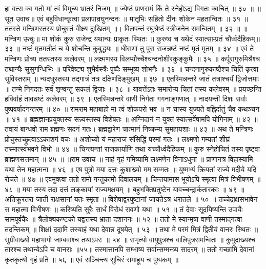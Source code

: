 हा वत्स क्व गतो मां त्वं विमुच्य भ्रातरं निजम् ॥
ज्येष्ठं प्राणसमं किं ते स्नेहोऽद्य विगतः क्वचित् ॥ ३० ॥
॥सूत उवाच॥
एवं बहुविधान्कृत्वा प्रलापान्रघुनन्दनः ॥
मातृभिः सहितो दीनः शोकेन महतान्वितः ॥ ३१ ॥
ततस्ते मन्त्रिणस्तस्य प्रोचुस्तं वीक्ष्य दुःखितम् ॥।
विलपन्तं रघुश्रेष्ठं स्त्रीजनेन समन्वितम् ॥ ३२ ॥
॥मन्त्रिण ऊचुः॥
मा शोकं कुरु राजेन्द्र यथान्यः प्राकृतः स्थितः ॥
कुरुष्व च यथेदं स्यात्साम्प्रतं चौर्ध्वदैहिकम्॥ ३३ ॥
नष्टं मृतमतीतं च ये शोचन्ति कुबुद्धयः ॥
धीराणां तु पुरा राजन्नष्टं नष्टं मृतं मृतम् ॥ ३४ ॥
एवं ते मन्त्रिणः प्रोच्य ततस्तस्य कलेवरम् ॥
लक्ष्मणस्य विलप्यौच्चैश्चन्दनोशीरकुङ्कुमैः ॥ ३५ ॥
कर्पूरागुरुमिश्रैश्च तथान्यैः सुसुगन्धिभिः ॥
परिवेष्ट्य शुभैर्वस्त्रैः पुष्पैः सम्भूष्य शोभनैः ॥ ३६ ॥
चन्दनागुरुकाष्ठैश्च चितिं कृत्वा सुविस्तराम् ॥
न्यदधुस्तस्य तद्गात्रं तत्र दक्षिणदिङ्मुखम् ॥ ३७ ॥
एतस्मिन्नन्तरे जातं तत्राश्चर्यं द्विजोत्तमाः ॥
तन्मे निगदतः सर्वं शृण्वन्तु सकलं द्विजाः ॥ ३८ ॥
यावत्तेंऽतः समारोप्य चितां तस्य कलेवरम् ॥
प्रयच्छन्ति हविर्वाहं तावन्नष्टं कलेवरम् ॥ ३९ ॥
एतस्मिन्नन्तरे वाणी निर्गता गगनाङ्गणात् ॥
नादयन्ती दिशः सर्वाः पुष्पवर्षादनन्तरम् ॥ ४० ॥
रामराम महाबाहो मा त्वं शोकपरो भव ॥
न चास्य युज्यते वह्निर्दातुं चैव कथञ्चन ॥ ४१ ॥
ब्रह्मज्ञानप्रयुक्तस्य सन्न्यस्तस्य विशेषतः ॥
अग्निदानं न युक्तं स्यात्सर्वेषामपि योगिनाम् ॥ ४२ ॥
तवायं बान्धवो राम ब्रह्मणः सदनं गतः।
ब्रह्मद्वारेण चात्मानं निष्क्रम्य सुमहायशाः ॥ ४३ ॥
अथ ते मन्त्रिणः प्रोचुस्तच्छ्रुत्वाऽऽकाशगं वचः ॥
अशोच्यो यं महाराज संसिद्धिं परमां गतः ॥
लक्ष्मणो गम्यतां शीघ्रं तस्मात्स्वभवने विभो ॥ ४४ ॥
चिन्त्यन्तां राजकार्याणि तथा यच्चौर्ध्वदैहिकम् ॥
कुरु स्नेहोचितं तस्य पृष्ट्वा ब्राह्मणसत्तमान् ॥ ४५ ॥
॥राम उवाच ॥
नाहं गृहं गमिष्यामि लक्ष्मणेन विनाऽधुना ॥
प्राणानत्र विहास्यामि यथा तेन महात्मना ॥ ४६ ॥
एष पुत्रो मया दत्तः कुशाख्यो मम सम्मतः ॥
युष्मभ्यं क्रियतां राज्ये मदीये यदि रोचते ॥ ४७ ॥
एवमुक्त्वा ततो रामो गन्तुकामो दिवालयम् ॥
चिन्तयामास भूयोऽपि स्मृत्वा मित्रं विभीषणम् ॥ ४८ ॥
मया तस्य तदा दत्तं लङ्कायां राज्यमक्षयम् ॥
बहुभक्तिप्रतुष्टेन यावच्चन्द्रार्कतारकाः ॥ ४९ ॥
अतिक्रूरतरा जाती राक्षसानां यतः स्मृता ॥
विशेषाद्वरपुष्टानां जायतेऽत्र धरातले ॥ ५० ॥
तच्चेद्राक्षसभावेन स महात्मा विभीषणः ॥
करिष्यति सुरैः सार्धं विरोधं रावणो यथा ॥ ५१ ॥
तं देवाः सूदयिष्यन्ति उपायैः सामपूर्वकैः ॥
त्रैलोक्यकण्टको यद्वत्तस्य भ्राता दशाननः ॥ ५२ ॥
ततो मे स्यान्मृषा वाणी तस्माद्गत्वा तदन्तिकम् ॥
शिक्षां ददामि तस्याहं यथा देवान्न दूषयेत् ॥ ५३ ॥
तथा मे परमं मित्रं द्वितीयं वानरः स्थितः ॥
सुग्रीवाख्यो महाभागो जाम्बवांश्च तथाऽपरः ॥ ५४ ॥
सभृत्यो वायुपुत्रश्च वालिपुत्रसमन्वितः ॥
कुमुदाख्यश्च तारश्च तथान्येऽपि च वानराः ॥५५॥
तस्मात्तानपि सम्भाष्य सर्वान्सम्मन्त्र्य सादरम् ॥
ततो गच्छामि देवानां कृतकृत्यो गृहं प्रति ॥ ५६ ॥
एवं सञ्चिन्त्य सुचिरं समाहूय च पुष्पकम् ॥

